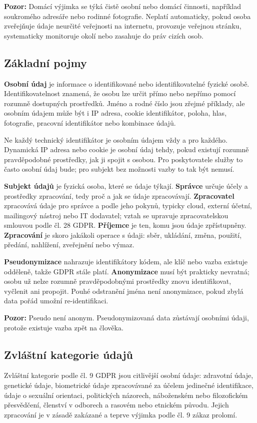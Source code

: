 \documentclass[11pt,a4paper]{article}
\newcommand{\pozor}[1]{\begin{tcolorbox}[breakable,enhanced,colback=red!7,colframe=red!30!black,boxrule=0pt,arc=1mm,left=5pt,right=5pt,top=5pt,bottom=5pt,before skip=6pt,after skip=6pt]\textbf{Pozor:} #1\end{tcolorbox}}
\begin{document}
\pozor{Domácí výjimka se týká čistě osobní nebo domácí činnosti, například soukromého adresáře nebo rodinné fotografie. Neplatí automaticky, pokud osoba zveřejňuje údaje neurčité veřejnosti na internetu, provozuje veřejnou stránku, systematicky monitoruje okolí nebo zasahuje do práv cizích osob.}

\subsection*{Základní pojmy}
\textbf{Osobní údaj} je informace o identifikované nebo identifikovatelné fyzické osobě. Identifikovatelnost znamená, že osobu lze určit přímo nebo nepřímo pomocí rozumně dostupných prostředků. Jméno a rodné číslo jsou zřejmé příklady, ale osobním údajem může být i IP adresa, cookie identifikátor, poloha, hlas, fotografie, pracovní identifikátor nebo kombinace údajů.

Ne každý technický identifikátor je osobním údajem vždy a pro každého. Dynamická IP adresa nebo cookie je osobní údaj tehdy, pokud existují rozumně pravděpodobné prostředky, jak ji spojit s osobou. Pro poskytovatele služby to často osobní údaj bude; pro subjekt bez možnosti vazby to tak být nemusí.

\textbf{Subjekt údajů} je fyzická osoba, které se údaje týkají. \textbf{Správce} určuje účely a prostředky zpracování, tedy proč a jak se údaje zpracovávají. \textbf{Zpracovatel} zpracovává údaje pro správce a podle jeho pokynů, typicky cloud, externí účetní, mailingový nástroj nebo IT dodavatel; vztah se upravuje zpracovatelskou smlouvou podle čl. 28 GDPR. \textbf{Příjemce} je ten, komu jsou údaje zpřístupněny. \textbf{Zpracování} je skoro jakákoli operace s údaji: sběr, ukládání, změna, použití, předání, nahlížení, zveřejnění nebo výmaz.

\textbf{Pseudonymizace} nahrazuje identifikátory kódem, ale klíč nebo vazba existuje odděleně, takže GDPR stále platí. \textbf{Anonymizace} musí být prakticky nevratná; osobu už nelze rozumně pravděpodobnými prostředky znovu identifikovat, vyčlenit ani propojit. Pouhé odstranění jména není anonymizace, pokud zbylá data pořád umožní re-identifikaci.

\pozor{Pseudo není anonym. Pseudonymizovaná data zůstávají osobními údaji, protože existuje vazba zpět na člověka.}

\subsection*{Zvláštní kategorie údajů}
Zvláštní kategorie podle čl. 9 GDPR jsou citlivější osobní údaje: zdravotní údaje, genetické údaje, biometrické údaje zpracovávané za účelem jedinečné identifikace, údaje o sexuální orientaci, politických názorech, náboženském nebo filozofickém přesvědčení, členství v odborech a rasovém nebo etnickém původu. Jejich zpracování je v zásadě zakázané a teprve výjimka podle čl. 9 zákaz prolomí.
\end{document}

